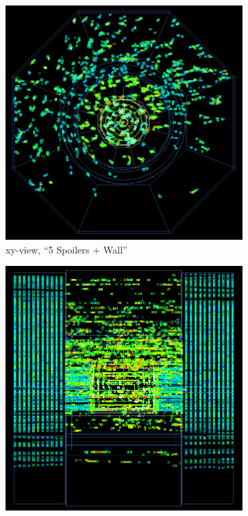 \begin{figure}
    \centering
    \begin{subfigure}[b]{0.49\textwidth}
    \begin{center}
        \includegraphics[height=0.3\textheight]{figures/muons_positron_5spoilers_wall_515_xyview_croped.png}
        \caption{xy-view, ``5 Spoilers + Wall''}
	\label{fig:xy_5SpoilersWall}
    \end{center}
    \end{subfigure}
    \begin{subfigure}[b]{0.49\textwidth}
    \begin{center}
        \includegraphics[height=0.3\textheight]{figures/muons_positron_5spoilers_wall_515_zyview_croped.png}

\end{center}
\end{subfigure}
\end{figure}
